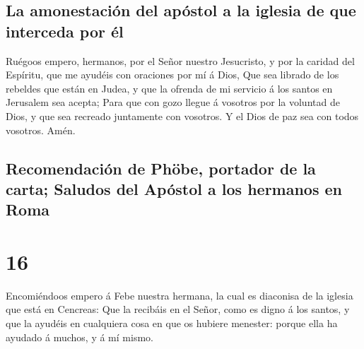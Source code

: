 \hypertarget{la-amonestaciuxf3n-del-apuxf3stol-a-la-iglesia-de-que-interceda-por-uxe9l}{%
\subsection{La amonestación del apóstol a la iglesia de que interceda
por
él}\label{la-amonestaciuxf3n-del-apuxf3stol-a-la-iglesia-de-que-interceda-por-uxe9l}}

 Ruégoos empero, hermanos, por el Señor nuestro
Jesucristo, y por la caridad del Espíritu, que me ayudéis con oraciones
por mí á Dios,  Que sea librado de los rebeldes que están
en Judea, y que la ofrenda de mi servicio á los santos en Jerusalem sea
acepta;  Para que con gozo llegue á vosotros por la
voluntad de Dios, y que sea recreado juntamente con vosotros.
 Y el Dios de paz sea con todos vosotros. Amén.

\hypertarget{recomendaciuxf3n-de-phuxf6be-portador-de-la-carta-saludos-del-apuxf3stol-a-los-hermanos-en-roma}{%
\subsection{Recomendación de Phöbe, portador de la carta; Saludos del
Apóstol a los hermanos en
Roma}\label{recomendaciuxf3n-de-phuxf6be-portador-de-la-carta-saludos-del-apuxf3stol-a-los-hermanos-en-roma}}

\hypertarget{section-45-16}{%
\section{16}\label{section-45-16}}

 Encomiéndoos empero á Febe nuestra hermana, la cual es
diaconisa de la iglesia que está en Cencreas:  Que la
recibáis en el Señor, como es digno á los santos, y que la ayudéis en
cualquiera cosa en que os hubiere menester: porque ella ha ayudado á
muchos, y á mí mismo.

